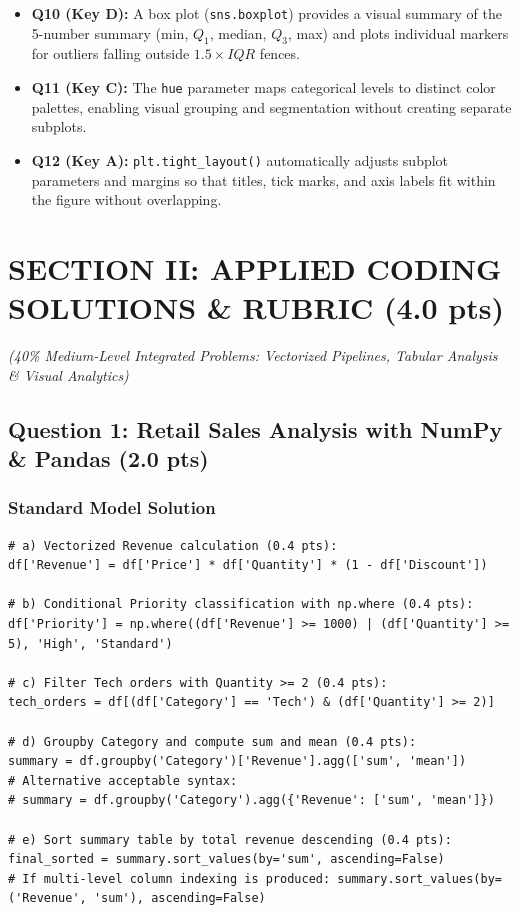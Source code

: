 \documentclass[11pt,a4paper]{article}
\begin{document}
\begin{itemize}[leftmargin=*, itemsep=3.5pt]
  \item \textbf{Q10 (Key D):} A box plot (\texttt{sns.boxplot}) provides a visual summary of the 5-number summary (min, $Q_1$, median, $Q_3$, max) and plots individual markers for outliers falling outside $1.5 \times IQR$ fences.
  \item \textbf{Q11 (Key C):} The \texttt{hue} parameter maps categorical levels to distinct color palettes, enabling visual grouping and segmentation without creating separate subplots.
  \item \textbf{Q12 (Key A):} \texttt{plt.tight\_layout()} automatically adjusts subplot parameters and margins so that titles, tick marks, and axis labels fit within the figure without overlapping.
\end{itemize}

\clearpage
\section*{SECTION II: APPLIED CODING SOLUTIONS \& RUBRIC (4.0 pts)}
\textit{\small (40\% Medium-Level Integrated Problems: Vectorized Pipelines, Tabular Analysis \& Visual Analytics)}

\subsection*{Question 1: Retail Sales Analysis with NumPy \& Pandas (2.0 pts)}

\subsubsection*{Standard Model Solution}
\begin{lstlisting}
# a) Vectorized Revenue calculation (0.4 pts):
df['Revenue'] = df['Price'] * df['Quantity'] * (1 - df['Discount'])

# b) Conditional Priority classification with np.where (0.4 pts):
df['Priority'] = np.where((df['Revenue'] >= 1000) | (df['Quantity'] >= 5), 'High', 'Standard')

# c) Filter Tech orders with Quantity >= 2 (0.4 pts):
tech_orders = df[(df['Category'] == 'Tech') & (df['Quantity'] >= 2)]

# d) Groupby Category and compute sum and mean (0.4 pts):
summary = df.groupby('Category')['Revenue'].agg(['sum', 'mean'])
# Alternative acceptable syntax:
# summary = df.groupby('Category').agg({'Revenue': ['sum', 'mean']})

# e) Sort summary table by total revenue descending (0.4 pts):
final_sorted = summary.sort_values(by='sum', ascending=False)
# If multi-level column indexing is produced: summary.sort_values(by=('Revenue', 'sum'), ascending=False)
\end{lstlisting}
\end{document}
